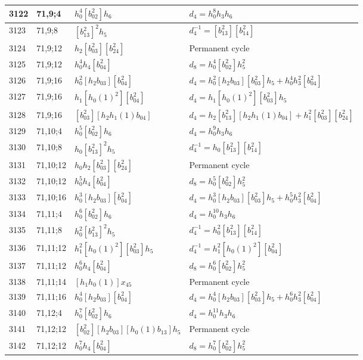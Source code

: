 \documentclass{article}
\begin{document}
\begin{longtable}{|l|l|>{\raggedright\arraybackslash}p{6cm}|>{\raggedright\arraybackslash}p{6cm}|}
\hline
3122 & 71,9;4 & $h_0^4[b_{02}^2]h_6$ &$d_{4}=h_0^8h_3h_6$\\
\hline
3123 & 71,9;8 & $[b_{13}^2]^2h_5$ & $d_{4}^{-1}=[b_{13}^2][b_{14}^2]$\\
\hline
3124 & 71,9;12 & $h_2[b_{03}^2][b_{24}^2]$ & Permanent cycle\\
3125 & 71,9;12 & $h_0^4h_4[b_{04}^2]$ &$d_{8}=h_0^4[b_{02}^2]h_5^2$\\
\hline
3126 & 71,9;16 & $h_0^2[h_2b_{03}][b_{04}^2]$ &$d_{4}=h_0^2[h_2b_{03}][b_{03}^2]h_5 + h_0^4h_3^2[b_{04}^2]$\\
3127 & 71,9;16 & $h_1[h_0(1)^2][b_{04}^2]$ &$d_{4}=h_1[h_0(1)^2][b_{03}^2]h_5$\\
3128 & 71,9;16 & $[b_{03}^2][h_2h_1(1)b_{04}]$ &$d_{4}=h_2[b_{13}^2][h_2h_1(1)b_{04}] + h_1^2[b_{03}^2][b_{24}^2]$\\
\hline
3129 & 71,10;4 & $h_0^5[b_{02}^2]h_6$ &$d_{4}=h_0^9h_3h_6$\\
\hline
3130 & 71,10;8 & $h_0[b_{13}^2]^2h_5$ & $d_{4}^{-1}=h_0[b_{13}^2][b_{14}^2]$\\
\hline
3131 & 71,10;12 & $h_0h_2[b_{03}^2][b_{24}^2]$ & Permanent cycle\\
3132 & 71,10;12 & $h_0^5h_4[b_{04}^2]$ &$d_{8}=h_0^5[b_{02}^2]h_5^2$\\
\hline
3133 & 71,10;16 & $h_0^3[h_2b_{03}][b_{04}^2]$ &$d_{4}=h_0^3[h_2b_{03}][b_{03}^2]h_5 + h_0^5h_3^2[b_{04}^2]$\\
\hline
3134 & 71,11;4 & $h_0^6[b_{02}^2]h_6$ &$d_{4}=h_0^{10}h_3h_6$\\
\hline
3135 & 71,11;8 & $h_0^2[b_{13}^2]^2h_5$ & $d_{4}^{-1}=h_0^2[b_{13}^2][b_{14}^2]$\\
\hline
3136 & 71,11;12 & $h_1^2[h_0(1)^2][b_{03}^2]h_5$ & $d_{4}^{-1}=h_1^2[h_0(1)^2][b_{04}^2]$\\
3137 & 71,11;12 & $h_0^6h_4[b_{04}^2]$ &$d_{8}=h_0^6[b_{02}^2]h_5^2$\\
\hline
3138 & 71,11;14 & $[h_1h_0(1)]x_{45}$ & Permanent cycle\\
\hline
3139 & 71,11;16 & $h_0^4[h_2b_{03}][b_{04}^2]$ &$d_{4}=h_0^4[h_2b_{03}][b_{03}^2]h_5 + h_0^6h_3^2[b_{04}^2]$\\
\hline
3140 & 71,12;4 & $h_0^7[b_{02}^2]h_6$ &$d_{4}=h_0^{11}h_3h_6$\\
\hline
3141 & 71,12;12 & $[b_{02}^2][h_2b_{03}][h_0(1)b_{13}]h_5$ & Permanent cycle\\
3142 & 71,12;12 & $h_0^7h_4[b_{04}^2]$ &$d_{8}=h_0^7[b_{02}^2]h_5^2$\\

\end{longtable}
\end{document}
